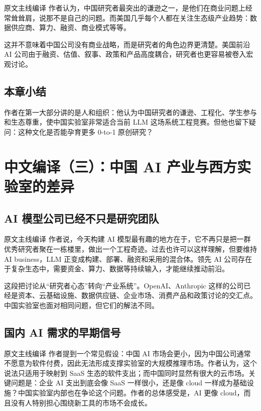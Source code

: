 \documentclass[a4paper]{article}
\begin{document}
\begin{translationbox}{原文主线编译}
作者认为，中国研究者最突出的谦逊之一，是他们在商业问题上经常耸耸肩，说那不是自己的问题。而美国几乎每个人都在关注生态级产业趋势：数据供应商、算力、融资、商业模式等等。
\end{translationbox}

这并不意味着中国公司没有商业战略，而是研究者的角色边界更清楚。美国前沿 AI 公司由于融资、估值、叙事、政策和产品高度耦合，研究者也更容易被卷入宏观讨论。

\subsection{本章小结}

作者在第一大部分讲的是人和组织：他认为中国研究者的谦逊、工程化、学生参与和生态尊重，使中国实验室非常适合当前 LLM 这场系统工程竞赛。但他也留下疑问：这种文化是否能孕育更多 0-to-1 原创研究？


\section{中文编译（三）：中国 AI 产业与西方实验室的差异}

\subsection{AI 模型公司已经不只是研究团队}

\begin{translationbox}{原文主线编译}
作者说，今天构建 AI 模型最有趣的地方在于，它不再只是把一群优秀研究者聚在一栋楼里，做出一个工程奇迹。过去也许可以这样理解，但要维持 AI business，LLM 正变成构建、部署、融资和采用的混合体。领先 AI 公司存在于复杂生态中，需要资金、算力、数据等持续输入，才能继续推动前沿。
\end{translationbox}

这段把讨论从``研究者心态''转向``产业系统''。OpenAI、Anthropic 这样的公司已经是资本、云基础设施、数据供应链、企业市场、消费产品和政策讨论的交汇点。中国实验室也面对相同问题，但它们的解法不同。

\subsection{国内 AI 需求的早期信号}

\begin{translationbox}{原文主线编译}
作者提到一个常见假设：中国 AI 市场会更小，因为中国公司通常不愿意为软件付费，因此无法形成支撑实验室的大规模推理市场。作者认为，这个说法只适用于映射到 SaaS 生态的软件支出；而中国同时显然有很大的云市场。关键问题是：企业 AI 支出到底会像 SaaS 一样很小，还是像 cloud 一样成为基础设施？中国实验室内部也在争论这个问题。作者的总体感受是，AI 更像 cloud，而且没有人特别担心围绕新工具的市场不会成长。
\end{translationbox}
\end{document}
